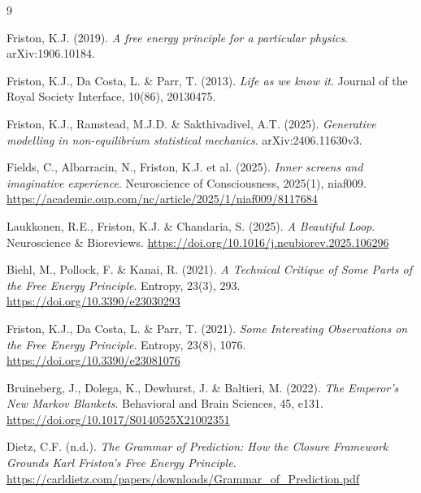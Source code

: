 \documentclass[11pt,a4paper]{article}
\begin{document}
\newpage
\begin{thebibliography}{9}

Friston, K.J. (2019).
\textit{A free energy principle for a particular physics}.
arXiv:1906.10184.

Friston, K.J., Da Costa, L. \& Parr, T. (2013).
\textit{Life as we know it}.
Journal of the Royal Society Interface, 10(86), 20130475.

Friston, K.J., Ramstead, M.J.D. \& Sakthivadivel, A.T. (2025).
\textit{Generative modelling in non-equilibrium statistical mechanics}.
arXiv:2406.11630v3.

Fields, C., Albarracin, N., Friston, K.J. et al. (2025).
\textit{Inner screens and imaginative experience}.
Neuroscience of Consciousness, 2025(1), niaf009.
\url{https://academic.oup.com/nc/article/2025/1/niaf009/8117684}

Laukkonen, R.E., Friston, K.J. \& Chandaria, S. (2025).
\textit{A Beautiful Loop}.
Neuroscience \& Bioreviews.
\url{https://doi.org/10.1016/j.neubiorev.2025.106296}

Biehl, M., Pollock, F. \& Kanai, R. (2021).
\textit{A Technical Critique of Some Parts of the Free Energy Principle}.
Entropy, 23(3), 293.
\url{https://doi.org/10.3390/e23030293}

Friston, K.J., Da Costa, L. \& Parr, T. (2021).
\textit{Some Interesting Observations on the Free Energy Principle}.
Entropy, 23(8), 1076.
\url{https://doi.org/10.3390/e23081076}

Bruineberg, J., Dolega, K., Dewhurst, J. \& Baltieri, M. (2022).
\textit{The Emperor's New Markov Blankets}.
Behavioral and Brain Sciences, 45, e131.
\url{https://doi.org/10.1017/S0140525X21002351}

Dietz, C.F. (n.d.).
\textit{The Grammar of Prediction: How the Closure Framework Grounds Karl Friston's Free Energy Principle}.
\url{https://carldietz.com/papers/downloads/Grammar_of_Prediction.pdf}

\end{thebibliography}
\end{document}

